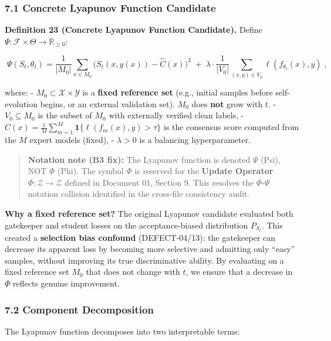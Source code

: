 \documentclass[
  12pt,
]{ctexart}
\begin{document}
\subsubsection{7.1 Concrete Lyapunov Function
Candidate}\label{concrete-lyapunov-function-candidate}

\textbf{Definition 23 (Concrete Lyapunov Function Candidate).} Define
\(\Psi: \mathcal{F} \times \Theta \to \mathbb{R}_{\geq 0}\):

\[\boxed{\;\Psi(S_t, \theta_t) = \frac{1}{|M_0|} \sum_{x \in M_0} \bigl(S_t(x, y(x)) - \hat{C}(x)\bigr)^2 \;+\; \lambda \cdot \frac{1}{|V_0|} \sum_{(x,y) \in V_0} \ell(f_{\theta_t}(x), y)\;},\]

where: - \(M_0 \subset \mathcal{X} \times \mathcal{Y}\) is a
\textbf{fixed reference set} (e.g., initial samples before
self-evolution begins, or an external validation set). \(M_0\) does
\textbf{not} grow with \(t\). - \(V_0 \subseteq M_0\) is the subset of
\(M_0\) with externally verified clean labels, -
\(\hat{C}(x) = \frac{1}{M}\sum_{m=1}^M \mathbf{1}\{\ell(f_m(x), y) > \tau\}\)
is the consensus score computed from the \(M\) expert models (fixed), -
\(\lambda > 0\) is a balancing hyperparameter.

\begin{quote}
\textbf{Notation note (B3 fix):} The Lyapunov function is denoted
\(\Psi\) (Psi), NOT \(\Phi\) (Phi). The symbol \(\Phi\) is reserved for
the \textbf{Update Operator} \(\Phi: \mathcal{Z} \to \mathcal{Z}\)
defined in Document 01, Section 9. This resolves the \(\Phi\)-\(\Psi\)
notation collision identified in the cross-file consistency audit.
\end{quote}

\textbf{Why a fixed reference set?} The original Lyapunov candidate
evaluated both gatekeeper and student losses on the acceptance-biased
distribution \(P_{S_t}\). This created a \textbf{selection bias
confound} (DEFECT-04/13): the gatekeeper can decrease its apparent loss
by becoming more selective and admitting only ``easy'' samples, without
improving its true discriminative ability. By evaluating on a fixed
reference set \(M_0\) that does not change with \(t\), we ensure that a
decrease in \(\Phi\) reflects genuine improvement.

\subsubsection{7.2 Component
Decomposition}\label{component-decomposition}

The Lyapunov function decomposes into two interpretable terms:
\end{document}
